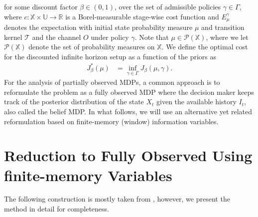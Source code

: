 \documentclass[letterpaper, 10 pt, conference]{ieeeconf}  %
\theoremstyle{definition}
\theoremstyle{remark}
\newcommand{\R}{\mathds{R}}
\begin{document}
 \noindent for some discount factor $\beta \in (0,1)$, over the set of admissible policies $\gamma\in\Gamma$, where $c:\mathds{X}\times\mathds{U}\to\R$ is a Borel-measurable stage-wise cost function and $E_\mu^{\gamma}$ denotes the expectation with initial state probability measure $\mu$ and transition kernel $\mathcal{T}$ and the channel $O$ under policy $\gamma$. Note that $\mu\in\mathcal{P}(\mathds{X})$, where we let $\mathcal{P}(\mathds{X})$ denote the set of probability measures on $\mathds{X}$. We define the optimal cost for the discounted infinite horizon setup as a function of the priors as
\begin{align}\label{opt_val}
  J_{\beta}^*(\mu)&=\inf_{\gamma\in\Gamma} J_{\beta}(\mu,\gamma).
\end{align}
For the analysis of partially observed MDPs, a common approach is to reformulate the problem as a fully observed MDP where the decision maker keeps track of the posterior distribution of the state $X_t$ given the available history $I_t$, also called the belief MDP. In what follows, we will use an alternative yet related reformulation based on finite-memory (window) information variables.






\section{Reduction to Fully Observed Using finite-memory Variables}\label{finite_memory}
 The following construction  is mostly taken from \cite{kara2023convergence}, however, we present the method in detail for completeness.
\end{document}
